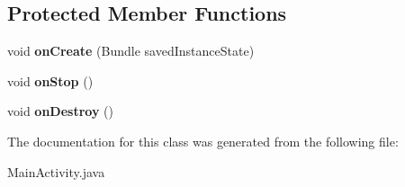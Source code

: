 \subsection*{Protected Member Functions}
\begin{DoxyCompactItemize}
\item 
\mbox{\label{classcom_1_1mycompany_1_1myfirstmapboxapp_1_1_main_activity_a95840dbaaacc10c2875e3d0971123267}} 
void {\bfseries on\+Create} (Bundle saved\+Instance\+State)
\item 
\mbox{\label{classcom_1_1mycompany_1_1myfirstmapboxapp_1_1_main_activity_a3c2e283d00e95587e027c9a879f2bdec}} 
void {\bfseries on\+Stop} ()
\item 
\mbox{\label{classcom_1_1mycompany_1_1myfirstmapboxapp_1_1_main_activity_a1b8efe1e0d0067b57439c3721912dfc2}} 
void {\bfseries on\+Destroy} ()
\end{DoxyCompactItemize}


The documentation for this class was generated from the following file\+:\begin{DoxyCompactItemize}
\item 
Main\+Activity.\+java\end{DoxyCompactItemize}
